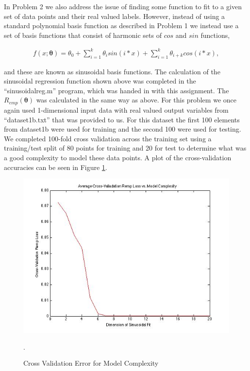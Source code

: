 \documentclass[paper=a4, fontsize=11pt]{scrartcl} %
\begin{document}
In Problem 2 we also address the issue of finding some function to fit to a given set of data points and their real valued labels.  However, instead of using a standard polynomial basis function as described in Problem 1 we instead use a set of basis functions that consist of harmonic sets of $cos$ and $sin$ functions, 

\begin{align}
f(x;\bm{\theta}) = \theta_{0} +\sum\limits_{i=1}^k \theta_{i}sin(i*x) + \sum\limits_{i=1}^k \theta_{i+k}cos(i*x),
\end{align}

and these are known as sinusoidal basis functions.
The calculation of the sinusoidal regression function shown above was completed in the  ``sinusoidalreg.m'' program, which was handed in with this assignment.  
The $R_{emp}(\bm{\theta})$ was calculated in the same way as above.
For this problem we once again used 1-dimensional input data with real valued output variables from ``dataset1b.txt'' that was provided to us.
For this dataset the first 100 elements from dataset1b were used for training and the second 100 were used for testing.
We completed 100-fold cross validation across the training set using a training/test split of 80 points for training and 20 for test to determine what was a good complexity to model these data points.
A plot of the cross-validation accuracies can be seen in Figure \ref{fig:prob2_crossvalerrors}.

\begin{figure}
\centering
\includegraphics[scale=0.4]{Prob2_CrossValError.jpg}
\caption{Cross Validation Error for Model Complexity}
\label{fig:prob2_crossvalerrors}.
\end{figure}
\end{document}
